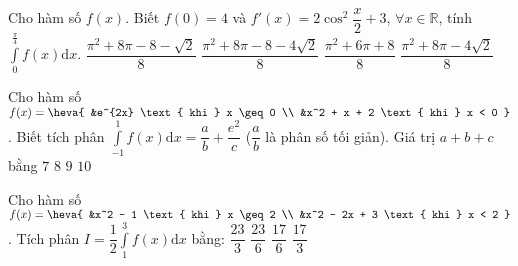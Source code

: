 \begin{ex}%
	Cho hàm số $f(x)$. Biết $f(0) = 4$ và $f'(x) = 2 \cos^2 \dfrac{x}{2} + 3$, $\forall x \in \mathbb{R}$, tính $\displaystyle\int\limits_{0}^{\frac{\pi}{4}} f(x) \mathrm{d}x$.
	\choice
	{$\dfrac{\pi^2 + 8\pi - 8 - \sqrt{2}}{8}$}
	{\True$\dfrac{\pi^2 + 8\pi - 8 - 4\sqrt{2}}{8}$}
	{$\dfrac{\pi^2 + 6\pi + 8}{8}$}
	{$\dfrac{\pi^2 + 8\pi - 4\sqrt{2}}{8}$}

\end{ex}
\begin{ex}%
	Cho hàm số $f(x) = \heva{
		&e^{2x} \text{ khi } x \geq 0 \\
		&x^2 + x + 2 \text{ khi } x < 0 
	}$. Biết tích phân $\displaystyle\int\limits_{-1}^{1} f(x) \mathrm{d}x = \dfrac{a}{b} + \dfrac{e^2}{c}$ ($\dfrac{a}{b}$ là phân số tối giản). Giá trị $a + b + c$ bằng
	\choice
	{$7$}
	{$8$}
	{\True$9$}
	{$10$}
\end{ex}
\begin{ex}%
	Cho hàm số $f(x) = \heva{
		&x^2 - 1 \text{ khi } x \geq 2 \\
		&x^2 - 2x + 3 \text{ khi } x < 2 
	}$. Tích phân $I = \dfrac{1}{2} \displaystyle\int\limits_{1}^{3} f(x) \mathrm{d}x$ bằng:
	\choice
	{$\dfrac{23}{3}$}
	{\True $\dfrac{23}{6}$}
	{$\dfrac{17}{6}$}
	{$\dfrac{17}{3}$}
\end{ex}
